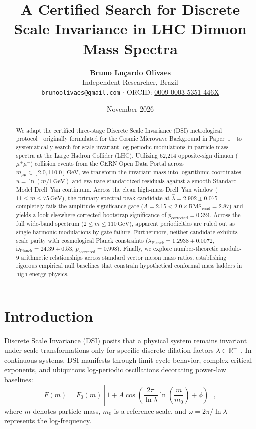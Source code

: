 \documentclass[11pt,a4paper]{article}
\title{\textbf{A Certified Search for Discrete Scale Invariance in LHC Dimuon Mass Spectra}}
\author{
    \textbf{Bruno Lu\c{c}ardo Olivaes}\\[0.2cm]
    \small Independent Researcher, Brazil\\
    \small \texttt{brunoolivaes@gmail.com} $\cdot$ ORCID: \href{https://orcid.org/0009-0003-5351-446X}{0009-0003-5351-446X}
}
\date{November 2026}
\begin{document}
\maketitle

\begin{abstract}
We adapt the certified three-stage Discrete Scale Invariance (DSI) metrological protocol---originally formulated for the Cosmic Microwave Background in Paper~1---to systematically search for scale-invariant log-periodic modulations in particle mass spectra at the Large Hadron Collider (LHC). Utilizing 62,214 opposite-sign dimuon ($\mu^+\mu^-$) collision events from the CERN Open Data Portal across $m_{\mu\mu} \in [2.0, 110.0]\,\text{GeV}$, we transform the invariant mass into logarithmic coordinates $u = \ln(m / 1\,\text{GeV})$ and evaluate standardized residuals against a smooth Standard Model Drell--Yan continuum. Across the clean high-mass Drell--Yan window ($11 \le m \le 75\,\text{GeV}$), the primary spectral peak candidate at $\hat{\lambda} = 2.902 \pm 0.075$ completely fails the amplitude significance gate ($A = 2.15 < 2.0\times\text{RMS}_{\text{resid}} = 2.87$) and yields a look-elsewhere-corrected bootstrap significance of $p_{\text{corrected}} = 0.324$. Across the full wide-band spectrum ($2 \le m \le 110\,\text{GeV}$), apparent periodicities are ruled out as single harmonic modulations by gate failure. Furthermore, neither candidate exhibits scale parity with cosmological Planck constraints ($\hat{\lambda}_{\text{Planck}} = 1.2938 \pm 0.0072$, $\hat{\omega}_{\text{Planck}} = 24.39 \pm 0.53$, $p_{\text{corrected}}=0.998$). Finally, we explore number-theoretic modulo-9 arithmetic relationships across standard vector meson mass ratios, establishing rigorous empirical null baselines that constrain hypothetical conformal mass ladders in high-energy physics.
\end{abstract}

\section{Introduction}
Discrete Scale Invariance (DSI) posits that a physical system remains invariant under scale transformations only for specific discrete dilation factors $\lambda \in \mathbb{R}^+$~\cite{sornette1998}. In continuous systems, DSI manifests through limit-cycle behavior, complex critical exponents, and ubiquitous log-periodic oscillations decorating power-law baselines:
\begin{equation}
F(m) = F_0(m) \left[ 1 + A \cos\left( \frac{2\pi}{\ln\lambda} \ln\left(\frac{m}{m_0}\right) + \phi \right) \right],
\label{eq:dsi_mass}
\end{equation}
where $m$ denotes particle mass, $m_0$ is a reference scale, and $\omega = 2\pi / \ln\lambda$ represents the log-frequency.
\end{document}
